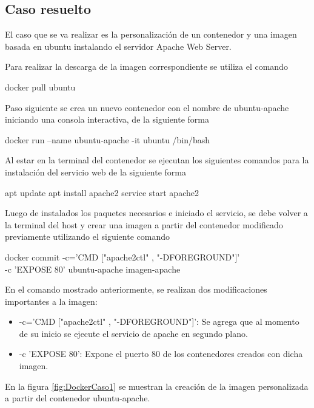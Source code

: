 \subsection{Caso resuelto}
El caso que se va realizar es la personalización de un contenedor y una imagen basada en ubuntu instalando el servidor Apache Web Server.

Para realizar la descarga de la imagen correspondiente se utiliza el comando

\begin{commandshell} docker pull ubuntu \end{commandshell}

Paso siguiente se crea un nuevo contenedor con el nombre de ubuntu-apache iniciando una consola interactiva, de la siguiente forma

\begin{commandshell} docker run --name ubuntu-apache -it ubuntu /bin/bash \end{commandshell}

Al estar en la terminal del contenedor se ejecutan los siguientes comandos para la instalación del servicio web de la siguiente forma 
\begin{commandshellroot}
apt update
apt install apache2
service start apache2
\end{commandshellroot}

Luego de instalados los paquetes necesarios e iniciado el servicio, se debe volver a la terminal del host y crear una imagen a partir del contenedor modificado previamente utilizando el siguiente comando

\begin{commandshell}
docker commit -c='CMD ["apache2ctl" , "-DFOREGROUND"]' \\
    -c 'EXPOSE 80' ubuntu-apache imagen-apache
\end{commandshell}

En el comando mostrado anteriormente, se realizan dos modificaciones importantes a la imagen: 
\begin{itemize}
    \item -c='CMD ["apache2ctl" , "-DFOREGROUND"]': Se agrega que al momento de su inicio se ejecute el servicio de apache en segundo plano.
    \item -c 'EXPOSE 80': Expone el puerto 80 de los contenedores creados con dicha imagen.
\end{itemize}

En la figura \ref{fig:DockerCaso1} se muestran la creación de la imagen personalizada a partir del contenedor ubuntu-apache.

